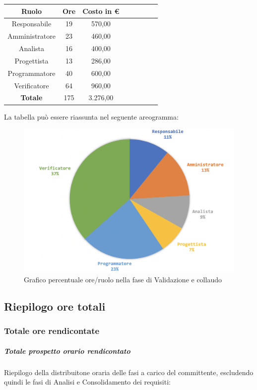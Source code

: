 		\begin{longtable}{|c|c|c|c|c|c|c|c}
			\hline
			\rowcolor{lighter-grayer}
			\textbf{Ruolo} & \textbf{Ore} & \textbf{Costo in € } \\
			\hline
			\endfirsthead
			
			\hline
			Responsabile 	    & 19 & 570,00\\
			\hline 
			\hline
			Amministratore	  & 23 & 460,00\\
			\hline
			\hline
			Analista 				& 16 & 400,00\\
			\hline
			\hline
			Progettista 		  & 13 & 286,00\\
			\hline
			\hline
			Programmatore 	 & 40 & 600,00\\
			\hline
			\hline
			Verificatore 		  & 64 & 960,00\\
			\hline
			\textbf{Totale} 	& 175 & 3.276,00\\
			\hline
			
		\end{longtable}
		\pagebreak
		
		La tabella può essere riassunta nel seguente areogramma:
		\begin{figure}[H]
			\centering
			\includegraphics[width=0.8\linewidth]{./images/validColl2.png}
			\caption{Grafico percentuale ore/ruolo nella fase di Validazione e collaudo}
			\label{fig:grafico costi ruolo fase Validazione e collaudo}
		\end{figure}
		
		\subsection{Riepilogo ore totali}
			\subsubsection{Totale ore rendicontate}
				\subparagraph{Totale prospetto orario rendicontato}
				Riepilogo della distribuitone oraria delle fasi a carico del committente, escludendo quindi le fasi di Analisi e Consolidamento dei requisiti:
				
